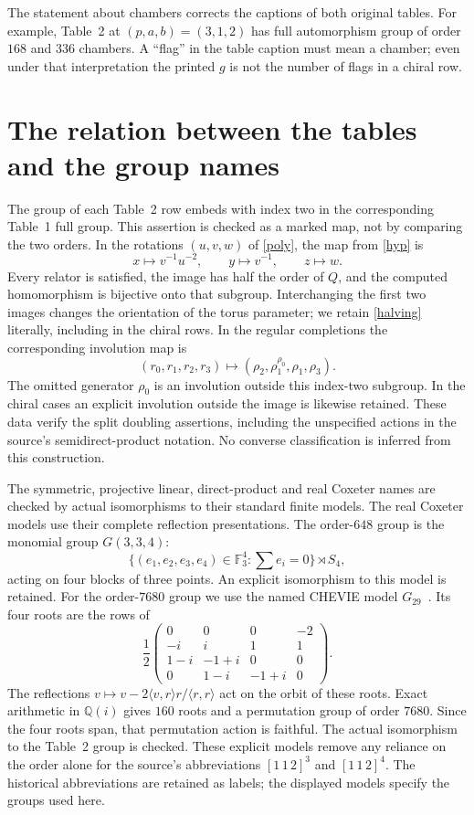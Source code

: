 \documentclass[11pt,a4paper]{article}
\begin{document}
The statement about chambers corrects the captions of both original
tables. For example, Table~2 at $(p,a,b)=(3,1,2)$ has full automorphism
group of order $168$ and $336$ chambers. A ``flag'' in the table caption
must mean a chamber; even under that interpretation the printed $g$
is not the number of flags in a chiral row.

\section{The relation between the tables and the group names}
The group of each Table~2 row embeds with index two in the corresponding
Table~1 full group. This assertion is checked as a marked map, not by
comparing the two orders. In the rotations $(u,v,w)$ of \eqref{poly},
the map from \eqref{hyp} is
\begin{equation}\label{halving}
 x\longmapsto v^{-1}u^{-2},\qquad
 y\longmapsto v^{-1},\qquad z\longmapsto w.
\end{equation}
Every relator is satisfied, the image has half the order of $Q$, and
the computed homomorphism is bijective onto that subgroup. Interchanging
the first two images changes the orientation of the torus parameter;
we retain \eqref{halving} literally, including in the chiral rows.
In the regular completions the corresponding involution map is
\[
 (r_0,r_1,r_2,r_3)\longmapsto
 (\rho_2,\rho_1^{\rho_0},\rho_1,\rho_3).
\]
The omitted generator $\rho_0$ is an involution outside this index-two
subgroup. In the chiral cases an explicit involution outside the image
is likewise retained. These data verify the split doubling assertions,
including the unspecified actions in the source's semidirect-product
notation. No converse classification is inferred from this construction.

The symmetric, projective linear, direct-product and real Coxeter names
are checked by actual isomorphisms to their standard finite models.
The real Coxeter models use their complete reflection presentations.
The order-$648$ group is the monomial group $G(3,3,4)$:
\[
 \{(e_1,e_2,e_3,e_4)\in\mathbb F_3^4:\sum e_i=0\}\rtimes S_4,
\]
acting on four blocks of three points. An explicit isomorphism to this
model is retained. For the order-$7680$ group we use the named CHEVIE
model $G_{29}$~\cite{chevie}. Its four roots are the rows of
\[
 \frac12\begin{pmatrix}
 0&0&0&-2\\-i&i&1&1\\1-i&-1+i&0&0\\0&1-i&-1+i&0
 \end{pmatrix}.
\]
The reflections $v\mapsto v-2\langle v,r\rangle r/\langle r,r\rangle$
act on the orbit of these roots. Exact arithmetic in $\mathbb Q(i)$
gives $160$ roots and a permutation group of order $7680$. Since the
four roots span, that permutation action is faithful. The actual
isomorphism to the Table~2 group is checked. These explicit models remove
any reliance on the order alone for the source's abbreviations
$[1\,1\,2]^3$ and $[1\,1\,2]^4$. The historical abbreviations are retained
as labels; the displayed models specify the groups used here.
\end{document}
